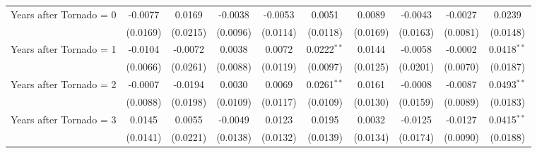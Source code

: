 \documentclass[letterpaper]{article}
\begin{document}
\begin{table}[H]
{\begin{tabular}{lccccccccc}
   Years after Tornado = 0      & -0.0077                           & 0.0169                           & -0.0038                            & -0.0053                            & 0.0051                       & 0.0089                           & -0.0043                     & -0.0027                    & 0.0239\\   
                                             & (0.0169)                          & (0.0215)                         & (0.0096)                           & (0.0114)                           & (0.0118)                     & (0.0169)                         & (0.0163)                    & (0.0081)                   & (0.0148)\\   
   Years after Tornado = 1      & -0.0104                           & -0.0072                          & 0.0038                             & 0.0072                             & 0.0222$^{**}$                & 0.0144                           & -0.0058                     & -0.0002                    & 0.0418$^{**}$\\   
                                             & (0.0066)                          & (0.0261)                         & (0.0088)                           & (0.0119)                           & (0.0097)                     & (0.0125)                         & (0.0201)                    & (0.0070)                   & (0.0187)\\   
   Years after Tornado = 2      & -0.0007                           & -0.0194                          & 0.0030                             & 0.0069                             & 0.0261$^{**}$                & 0.0161                           & -0.0008                     & -0.0087                    & 0.0493$^{**}$\\   
                                             & (0.0088)                          & (0.0198)                         & (0.0109)                           & (0.0117)                           & (0.0109)                     & (0.0130)                         & (0.0159)                    & (0.0089)                   & (0.0183)\\   
   Years after Tornado = 3      & 0.0145                            & 0.0055                           & -0.0049                            & 0.0123                             & 0.0195                       & 0.0032                           & -0.0125                     & -0.0127                    & 0.0415$^{**}$\\   
                                             & (0.0141)                          & (0.0221)                         & (0.0138)                           & (0.0132)                           & (0.0139)                     & (0.0134)                         & (0.0174)                    & (0.0090)                   & (0.0188)\\   

\end{tabular}}
\end{table}
\end{document}
